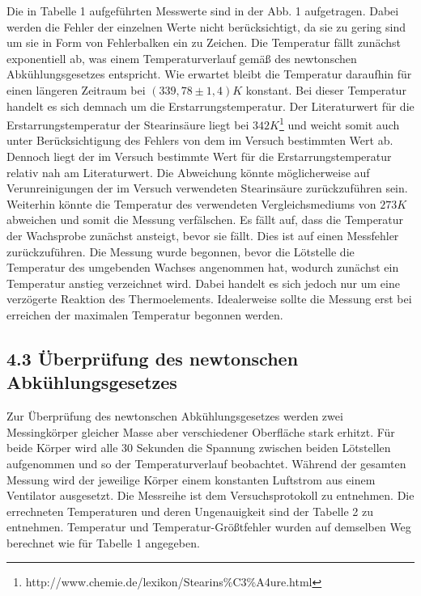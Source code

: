 \documentclass[a4paper]{article}
\begin{document}
Die in Tabelle 1 aufgeführten Messwerte sind in der Abb. 1 aufgetragen. Dabei werden die Fehler der einzelnen Werte nicht berücksichtigt, da sie zu gering sind um sie in Form von Fehlerbalken ein zu Zeichen. Die Temperatur fällt zunächst exponentiell ab, was einem Temperaturverlauf gemäß des newtonschen Abkühlungsgesetzes entspricht. Wie erwartet bleibt die Temperatur daraufhin für einen längeren Zeitraum bei $(339,78\pm 1,4)K$ konstant. Bei dieser Temperatur handelt es sich demnach um die Erstarrungstemperatur. Der Literaturwert für die Erstarrungstemperatur der Stearinsäure liegt bei $342K$\footnote{http://www.chemie.de/lexikon/Stearins\%C3\%A4ure.html} und weicht somit auch unter Berücksichtigung des Fehlers von dem im Versuch bestimmten Wert ab. Dennoch liegt der im Versuch bestimmte Wert für die Erstarrungstemperatur relativ nah am Literaturwert. Die Abweichung könnte möglicherweise auf Verunreinigungen der im Versuch verwendeten Stearinsäure zurückzuführen sein. Weiterhin könnte die Temperatur des verwendeten Vergleichsmediums von $273K$ abweichen und somit die Messung verfälschen. Es fällt auf, dass die Temperatur der Wachsprobe zunächst ansteigt, bevor sie fällt. Dies ist auf einen Messfehler zurückzuführen. Die Messung wurde begonnen, bevor die Lötstelle die Temperatur des umgebenden Wachses angenommen hat, wodurch zunächst ein Temperatur anstieg verzeichnet wird. Dabei handelt es sich jedoch nur um eine verzögerte Reaktion des Thermoelements. Idealerweise sollte die Messung erst bei erreichen der maximalen Temperatur begonnen werden. 
\subsection*{4.3 Überprüfung des newtonschen Abkühlungsgesetzes}
Zur Überprüfung des newtonschen Abkühlungsgesetzes werden zwei Messingkörper gleicher Masse aber verschiedener Oberfläche stark erhitzt. Für beide Körper wird alle 30 Sekunden die Spannung zwischen beiden Lötstellen aufgenommen und so der Temperaturverlauf beobachtet. Während der gesamten Messung wird der jeweilige Körper einem konstanten Luftstrom aus einem Ventilator ausgesetzt. Die Messreihe ist dem Versuchsprotokoll zu entnehmen. Die errechneten Temperaturen und deren Ungenauigkeit sind der Tabelle 2 zu entnehmen. Temperatur und Temperatur-Größtfehler wurden auf demselben Weg berechnet wie für Tabelle 1 angegeben.
\end{document}
